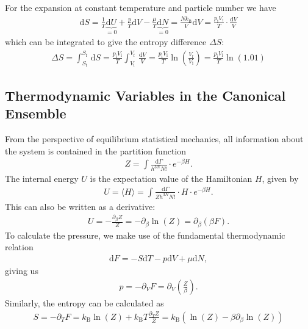 \documentclass[a4paper,10pt,bibtotoc]{scrartcl}
\begin{document}
For the expansion at constant temperature and particle number we have
\begin{align}
 \mathrm{d}S = \frac{1}{T}\underbrace{\mathrm{d}U}_{=0} + \frac{p}{T}\mathrm{d}V - \frac{\mu}{T}\underbrace{\mathrm{d}N}_{=0} = \frac{Nk_\mathrm{B}}{V}\mathrm{d}V = \frac{p_\mathrm{i} V_\mathrm{i}}{T}\cdot\frac{\mathrm{d}V}{V}
\end{align}
which can be integrated to give the entropy difference $\Delta S$:
\begin{align}
 \Delta S = \int_{S_\mathrm{i}}^{S_\mathrm{f}}\,\mathrm{d}S = \frac{p_\mathrm{i} V_\mathrm{i}}{T}\int_{V_\mathrm{i}}^{V_\mathrm{f}}\,\frac{\mathrm{d} V}{V} = \frac{p_\mathrm{i} V_\mathrm{i}}{T}\ln\left(\frac{V_\mathrm{f}}{V_\mathrm{i}}\right) = \frac{p_\mathrm{i} V_\mathrm{i}}{T}\ln\left(1.01\right)
\end{align}





\subsection{Thermodynamic Variables in the Canonical Ensemble}
From the perspective of equilibrium statistical mechanics, all information about the system is contained in the partition function 
\begin{align}
 Z = \int\frac{\mathrm{d}\Gamma}{h^{3N}N!}\cdot e^{-\beta H}.
\end{align}
The internal energy $U$ is the expectation value of the Hamiltonian $H$, given by
\begin{align}
 U = \langle H\rangle = \int\frac{\mathrm{d}\Gamma}{Zh^{3N}N!}\cdot H\cdot e^{-\beta H}.
\end{align}
This can also be written as a derivative:
\begin{align}
 U = -\frac{\partial_\beta Z}{Z} =-\partial_\beta\ln\left(Z\right) = \partial_\beta\left(\beta F\right).
\end{align}
To calculate the pressure, we make use of the fundamental thermodynamic relation
\begin{align}
 \mathrm{d}F = -S\mathrm{d}T - p\mathrm{d}V + \mu\mathrm{d}N,
\end{align}
giving us
\begin{align}
p = -\partial_V F = \partial_V\left(\frac{Z}{\beta}\right).
\end{align}
Similarly, the entropy can be calculated as
\begin{align}
 S = -\partial_T F = k_\mathrm{B}\ln\left( Z\right) + k_\mathrm{B}T \frac{\partial_T Z}{Z} = k_\mathrm{B}\left(\ln\left( Z\right)  -\beta \partial_\beta \ln\left(Z\right)\right)
\end{align}
\end{document}
